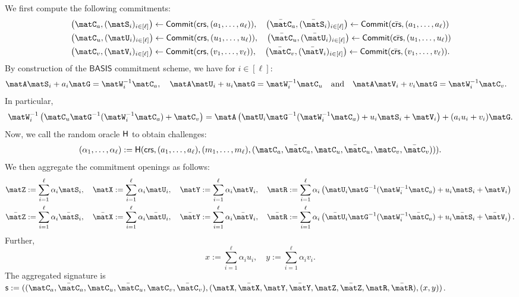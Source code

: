 \documentclass[11pt,letterpaper]{article}
\theoremstyle{definition} %
\newcommand{\from}{\gets}
\begin{document}
We first compute the following commitments:
\begin{align*}
& \left(\matC_a, (\matS_i)_{i \in [\ell]}\right) \from \commit(\crs,(a_1,\ldots,a_\ell)), \quad \left(\bar{\matC}_a, (\bar{\matS}_i)_{i \in [\ell]}\right) \from \commit(\bar{\crs},(a_1,\ldots,a_\ell)) \\
& \left(\matC_u, (\matU_i)_{i \in [\ell]}\right) \from \commit(\crs,(u_1,\ldots,u_\ell)), \quad \left(\bar{\matC}_u, (\bar{\matU}_i)_{i \in [\ell]}\right) \from \commit(\bar{\crs},(u_1,\ldots,u_\ell))\\
& \left(\matC_v, (\matV_i)_{i \in [\ell]}\right) \from \commit(\crs,(v_1,\ldots,v_\ell)), \quad \left(\bar{\matC}_v, (\bar{\matV}_i)_{i \in [\ell]}\right) \from \commit(\bar{\crs},(v_1,\ldots,v_\ell)).
\end{align*}
By construction of the $\mathsf{BASIS}$ commitment scheme, we have for $i \in [\ell]$:
\begin{align*}
& \matA\matS_i + a_i\matG = \matW_i^{-1} \matC_a,  \quad  \matA\matU_i + u_i\matG = \matW_i^{-1} \matC_u \quad \text{and} \quad \matA\matV_i + v_i\matG = \matW_i^{-1} \matC_v.   
\end{align*}
In particular,
\[ \matW_i^{-1}\left(\matC_u\matG^{-1}(\matW_i^{-1}\matC_a) + \matC_v\right) = \matA\left(\matU_i\matG^{-1}(\matW_i^{-1}\matC_a) + u_i\matS_i + \matV_i \right) + (a_iu_i + v_i)\matG.\]
Now, we call the random oracle $\mathsf{H}$ to obtain challenges:
\begin{equation}\label{eq:fiat-shamir} (\alpha_1,\ldots,\alpha_\ell) := \ro(\crs, (a_1,\ldots,a_\ell), (m_1,\ldots,m_\ell), (\matC_a,\bar{\matC}_a,\matC_u,\bar{\matC}_u,\matC_v,\bar{\matC}_v))).\end{equation}
We then aggregate the commitment openings as follows:
\begin{align*}
& \matZ := \sum^\ell_{i=1} \alpha_i\matS_i, \quad   \matX := \sum^\ell_{i=1} \alpha_i\matU_i, \quad \matY := \sum^\ell_{i=1} \alpha_i\matV_i, \quad \matR := \sum^\ell_{i=1} \alpha_i\left(\matU_i\matG^{-1}(\matW_i^{-1}\matC_a) + u_i\matS_i + \matV_i \right) \\
& \bar{\matZ} := \sum^\ell_{i=1} \alpha_i\bar{\matS}_i, \quad   \bar{\matX} := \sum^\ell_{i=1} \alpha_i\bar{\matU}_i, \quad \bar{\matY} := \sum^\ell_{i=1} \alpha_i\bar{\matV}_i, \quad \bar{\matR} := \sum^\ell_{i=1} \alpha_i\left(\bar{\matU}_i\matG^{-1}(\matW_i^{-1}\bar{\matC}_a) + u_i\bar{\matS}_i + \bar{\matV}_i \right).
\end{align*}
Further,
\[ x := \sum^\ell_{i=1} \alpha_iu_i, \quad y := \sum^\ell_{i=1} \alpha_iv_i.\]
The aggregated signature is
$\mathsf{s} := ((\matC_a,\bar{\matC}_a,\matC_u,\bar{\matC}_u,\matC_v,\bar{\matC}_v),(\matX,\bar{\matX},\matY,\bar{\matY},\matZ,\bar{\matZ},\matR,\bar{\matR}),(x,y))$.
\end{document}
